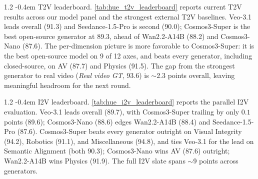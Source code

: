 \documentclass{llmxive}
\makeatletter
\providecommand{\paragraph}{  \@startsection{paragraph}{4}{\z@}    {1\baselineskip \@plus .2\baselineskip}    {-0.4em}    {\normalfont\normalsize\bfseries}}
\makeatother
\begin{document}
\paragraph{T2V leaderboard.} \cref{tab:hue_t2v_leaderboard} reports current T2V results across our model panel and the strongest external T2V baselines. Veo-3.1 leads overall (91.3) and Seedance-1.5-Pro is second (90.0); Cosmos3-Super is the best open-source generator at 89.3, ahead of Wan2.2-A14B (88.2) and Cosmos3-Nano (87.6). The per-dimension picture is more favorable to Cosmos3-Super: it is the best open-source model on 9 of 12 axes, and beats every generator, including closed-source, on AV (87.7) and Physics (91.5). The gap from the strongest generator to real video (\emph{Real video GT}, 93.6) is $\sim$2.3 points overall, leaving meaningful headroom for the next round.

\paragraph{I2V leaderboard.} \cref{tab:hue_i2v_leaderboard} reports the parallel I2V evaluation. Veo-3.1 leads overall (89.7), with Cosmos3-Super trailing by only $0.1$ points (89.6);
Cosmos3-Nano (88.6) edges Wan2.2-A14B (88.4) and Seedance-1.5-Pro (87.6). Cosmos3-Super beats every generator outright on Visual Integrity (94.2), Robotics (91.1), and Miscellaneous
(94.8), and ties Veo-3.1 for the lead on Semantic Alignment (both 90.3); Cosmos3-Nano wins AV (87.6) outright; Wan2.2-A14B wins Physics (91.9). The full I2V slate spans $\sim$9 points
across generators.
\end{document}
